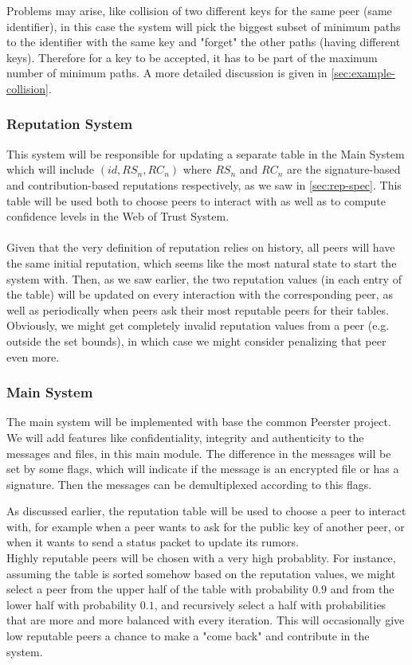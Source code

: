 \documentclass[]{article}
\begin{document}
Problems may arise, like collision of two different keys for the same peer (same identifier), in this case the system will pick the biggest subset of minimum paths to the identifier with the same key and "forget" the other paths (having different keys). Therefore for a key to be accepted, it has to be part of the maximum number of minimum paths. A more detailed discussion is given in \ref{sec:example-collision}.

\subsubsection{Reputation System}
This system will be responsible for updating a separate table in the Main System which will include $(id, RS_n, RC_n)$ where $RS_n$ and $RC_n$ are the signature-based and contribution-based reputations respectively, as we saw in \ref{sec:rep-spec}.
This table will be used both to choose peers to interact with as well as to compute confidence levels in the Web of Trust System.
\\\\
Given that the very definition of reputation relies on history, all peers will have the same initial reputation, which seems like the most natural state to start the system with.
Then, as we saw earlier, the two reputation values (in each entry of the table) will be updated on every interaction with the corresponding peer, as well as periodically when peers ask their most reputable peers for their tables.
\\
Obviously, we might get completely invalid reputation values from a peer (e.g. outside the set bounds), in which case we might consider penalizing that peer even more.

\subsubsection{Main System}
The main system will be implemented with base the common Peerster project. \\
We will add features like confidentiality, integrity and authenticity to the messages and files, in this main module. The difference in the messages will be set by some flags, which will indicate if the message is an encrypted file or has a signature. Then the messages can be demultiplexed according to this flags.

As discussed earlier, the reputation table will be used to choose a peer to interact with, for example when a peer wants to ask for the public key of another peer, or when it wants to send a status packet to update its rumors.
\\
Highly reputable peers will be chosen with a very high probablity. For instance, assuming the table is sorted somehow based on the reputation values, we might select a peer from the upper half of the table with probability $0.9$ and from the lower half with probability $0.1$, and recursively select a half with probabilities that are more and more balanced with every iteration.
This will occasionally give low reputable peers a chance to make a "come back" and contribute in the system.
\end{document}
